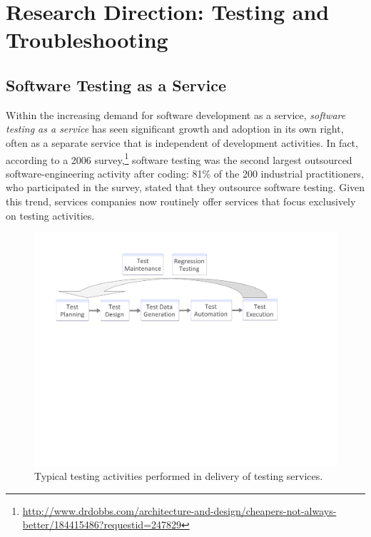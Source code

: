 
\section{Research Direction: Testing and Troubleshooting}
\label{sec:testing-debugging}

\subsection{Software Testing as a Service}

Within the increasing demand for software development as a service,
\textit{software testing as a service} has seen significant growth and adoption
in its own right, often as a separate service that is independent of development
activities. In fact, according to a 2006 survey,\footnote{\scriptsize
  \url{http://www.drdobbs.com/architecture-and-design/cheapers-not-always-better/184415486?requestid=247829}}
software testing was the second largest outsourced software-engineering activity
after coding: 81\% of the 200 industrial practitioners, who participated in the
survey, stated that they outsource software testing. Given this trend, services
companies now routinely offer services that focus exclusively on testing
activities.


\begin{figure}[t]
\centering
\includegraphics[width=\columnwidth, clip, trim = 20mm 133mm 55mm
  18mm]{figs/testing-activities.pdf}
\vspace*{-15pt}
\caption{Typical testing activities performed in delivery of testing services.}
\vspace*{-10pt}
\label{fig:testing-activities}
\end{figure}

